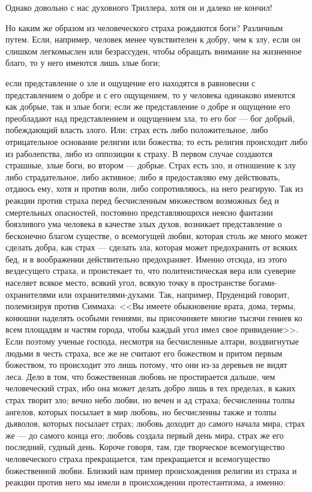 \documentclass[12pt]{article}
\begin{document}
Однако довольно с нас духовного Триллера, хотя он и далеко не кончил! 

Но каким же образом из человеческого страха рождаются боги? Различным путем. Если, например, человек менее чувствителен к добру, чем к злу, если он слишком легкомыслен или безрассуден, чтобы обращать внимание на жизненное благо, то у него имеются лишь злые боги; 

если представление о зле и ощущение его находятся в равновесии с представлением о добре и с его ощущением, то у человека одинаково имеются как добрые, так и злые боги; если же представление о добре и ощущение его преобладают над представлением и ощущением зла, то его бог --- бог добрый, побеждающий власть злого. Или: страх есть либо положительное, либо отрицательное основание религии или божества; то есть религия происходит либо из раболепства, либо из оппозиции к страху. В первом случае создаются страшные, злые боги, во втором --- добрые. Страх есть зло, и отношение к злу либо страдательное, либо активное; либо я предоставляю ему действовать, отдаюсь ему, хотя и против воли, либо сопротивляюсь, на него реагирую. Так из реакции против страха перед бесчисленным множеством возможных бед и смертельных опасностей, постоянно представляющихся неясно фантазии боязливого ума человека в качестве злых духов, возникает представление о бесконечно благом существе, о всемогущей любви, которая столь же много может сделать добра, как страх --- сделать зла, которая может предохранить от всяких бед, и в воображении действительно предохраняет. Именно отсюда, из этого вездесущего страха, и проистекает то, что политеистическая вера или суеверие населяет всякое место, всякий угол, всякую точку в пространстве богами-охранителями или охранителями-духами. Так, например, Пруденций говорит, полемизируя против Симмаха: <<Вы имеете обыкновение врата, дома, термы, конюшни наделять особыми гениями, вы присочиняете многие тысячи гениев ко всем площадям и частям города, чтобы каждый угол имел свое привидение>>. Если поэтому ученые господа, несмотря на бесчисленные алтари, воздвигнутые людьми в честь страха, все же не считают его божеством и притом первым божеством, то происходит это лишь потому, что они из-за деревьев не видят леса. Дело в том, что божественная любовь не простирается дальше, чем человеческий страх, ибо она может делать добро лишь в тех пределах, в каких страх творит зло; вечно небо любви, но вечен и ад страха; бесчисленны толпы ангелов, которых посылает в мир любовь, но бесчисленны также и толпы дьяволов, которых посылает страх; любовь доходит до самого начала мира, страх же --- до самого конца его; любовь создала первый день мира, страх же его последний, судный день. Короче говоря, там, где творческое всемогущество человеческого страха прекращается, там прекращается и всемогущество божественной любви. Близкий нам пример происхождения религии из страха и реакции против него мы имели в происхождении протестантизма, а именно: 
\end{document}
